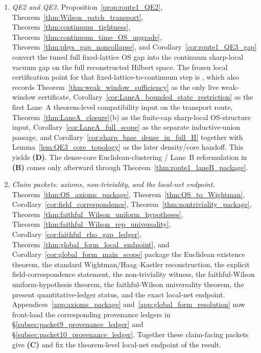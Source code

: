\begin{theorem}
\begin{enumerate}[label=\textbf{Step \arabic*:},leftmargin=2.6em]
This is the only sharp-local reconstruction packet later used by QE3 and Appendix~\ref{app:axioms_package}.
\item \emph{QE2 and QE3.}
Proposition~\ref{prop:route1_QE2}, Theorem~\ref{thm:Wilson_patch_transport}, Theorem~\ref{thm:continuum_tightness}, Theorem~\ref{thm:continuum_time_OS_upgrade}, Theorem~\ref{thm:phys_gap_noncollapse}, and Corollary~\ref{cor:route1_QE3_gap} convert the tuned full fixed-lattice OS gap into the continuum sharp-local vacuum gap on the full reconstructed Hilbert space.
The frozen local certification point for that fixed-lattice-to-continuum step is , which also records Theorem~\ref{thm:weak_window_sufficiency} as the only live weak-window certificate, Corollary~\ref{cor:LaneA_bounded_state_restriction} as the first Lane~A theorem-level compatibility input on the transport route, Theorem~\ref{thm:LaneA_closure}(b) as the finite-cap sharp-local OS-structure input, Corollary~\ref{cor:LaneA_full_scope} as the separate inductive-union passage, and Corollary~\ref{cor:sharp_base_dense_in_full_H} together with Lemma~\ref{lem:QE3_core_topology} as the later density/core handoff.
This yields \textbf{(D)}.
The dense-core Euclidean-clustering / Lane~B reformulation in \textbf{(B)} comes only afterward through Theorem~\ref{thm:route1_laneB_package}.
\item \emph{Claim packets: axioms, non-triviality, and the local-net endpoint.}
Theorem~\ref{thm:OS_axioms_package}, Theorem~\ref{thm:OS_to_Wightman}, Corollary~\ref{cor:field_correspondence}, Theorem~\ref{thm:nontriviality_package}, Theorem~\ref{thm:faithful_Wilson_uniform_hypotheses}, Theorem~\ref{thm:faithful_Wilson_rep_universality}, Corollary~\ref{cor:faithful_rho_gap_ledger}, Theorem~\ref{thm:global_form_local_endpoint}, and Corollary~\ref{cor:global_form_main_scope} package the Euclidean existence theorem, the standard Wightman/Haag--Kastler reconstruction, the explicit field-correspondence statement, the non-triviality witness, the faithful-Wilson uniform-hypothesis theorem, the faithful-Wilson universality theorem, the present quantitative-ledger status, and the exact local-net endpoint. Appendices~\ref{app:axioms_package} and~\ref{app:global_form_resolution} now front-load the corresponding provenance ledgers in \S\ref{subsec:packet9_provenance_ledger} and \S\ref{subsec:packet10_provenance_ledger}.
Together these claim-facing packets give \textbf{(C)} and fix the theorem-level local-net endpoint of the result.
\end{enumerate}


\end{theorem}

